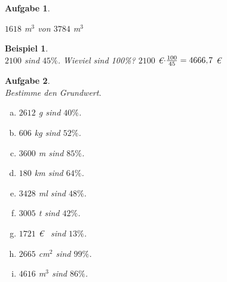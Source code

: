 \documentclass[12pt,fleqn]{article}
\theoremstyle{aufg}
\newtheorem{aufgabe}{Aufgabe}
\theoremstyle{bsp}
\newtheorem{beispiel}{Beispiel}
\begin{document}
\begin{flushleft}
\begin{aufgabe}
\begin{multicols}{3}
\begin{enumerate}[a)]
$1618$ m$^3$ von $3784$ m$^3$
\end{enumerate} 
\end{multicols} 
\end{aufgabe} 
\begin{beispiel} ~ \\ 
$2100$ sind $45\%$. Wieviel sind 100\%? $2100$ \euro$\cdot \frac{100}{45}= 4666,\hspace{-1pt}7$ \euro\end{beispiel} 
\begin{aufgabe} ~ \\ 
Bestimme den Grundwert.\begin{multicols}{3} 
\begin{enumerate}[a)] 
\item 
$2612$ g sind $40\%$.
\item 
$606$ kg sind $52\%$.
\item 
$3600$ m sind $85\%$.
\item 
$180$ km sind $64\%$.
\item 
$3428$ ml sind $48\%$.
\item 
$3005$ t sind $42\%$.
\item 
$1721$ \euro~ sind $13\%$.
\item 
$2665$ cm$^2$ sind $99\%$.
\item 
$4616$ m$^3$ sind $86\%$.
\end{enumerate} 
\end{multicols} 
\end{aufgabe} 

\end{flushleft}
\end{document}
